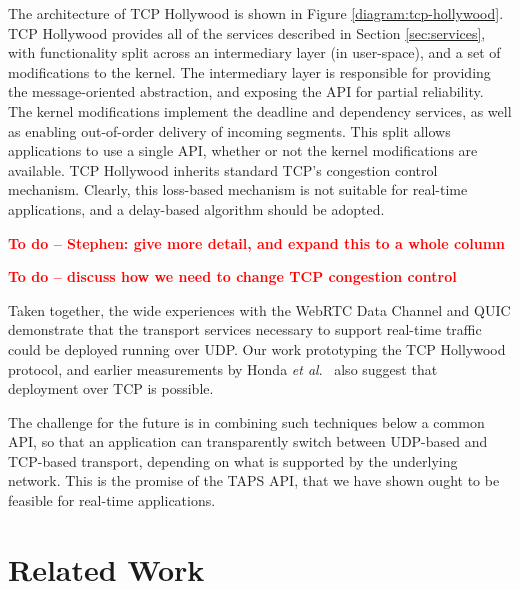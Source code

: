 \documentclass[10pt]{sig-alternate-05-2015}
\newcommand{\todo}[1]{\textbf{\textcolor{red}{To do -- #1}}}
\begin{document}
The architecture of TCP Hollywood is shown in
Figure \ref{diagram:tcp-hollywood}. TCP Hollywood provides all of the
services described in Section \ref{sec:services}, with functionality split
across an intermediary layer (in user-space), and a set of modifications to
the kernel. The intermediary layer is responsible for providing the
message-oriented abstraction, and exposing the API for partial reliability.
The kernel modifications implement the deadline and dependency services,
as well as enabling out-of-order delivery of incoming segments. This split
allows applications to use a single API, whether or not the kernel
modifications are available. TCP Hollywood inherits standard TCP's
congestion control mechanism. Clearly, this loss-based mechanism is not
suitable for real-time applications, and a delay-based algorithm should
be adopted.

\todo{Stephen: give more detail, and expand this to a whole column}

\todo{discuss how we need to change TCP congestion control}

Taken together, the wide experiences with the WebRTC Data Channel and QUIC
demonstrate that the transport services necessary to support real-time
traffic could be deployed running over UDP. Our work prototyping the TCP
Hollywood protocol, and earlier measurements by Honda \emph{et al}.\
\cite{honda:2011:extend-tcp} also suggest that deployment over TCP is
possible.

The challenge for the future is in combining such techniques below a common
API, so that an application can transparently switch between UDP-based and
TCP-based transport, depending on what is supported by the underlying
network. This is the promise of the TAPS API, that we have shown ought to
be feasible for real-time applications.

\section{Related Work}
\label{sec:related}

%
%
\end{document}
